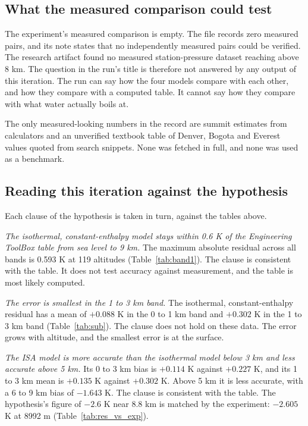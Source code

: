 \documentclass[11pt,letterpaper]{article}
\begin{document}
\subsection{What the measured comparison could test}

The experiment's measured comparison is empty. The file records zero measured pairs, and its note states that no independently measured pairs could be verified. The research artifact found no measured station-pressure dataset reaching above 8 km. The question in the run's title is therefore not answered by any output of this iteration. The run can say how the four models compare with each other, and how they compare with a computed table. It cannot say how they compare with what water actually boils at.

The only measured-looking numbers in the record are summit estimates from calculators and an unverified textbook table of Denver, Bogota and Everest values quoted from search snippets. None was fetched in full, and none was used as a benchmark.

\subsection{Reading this iteration against the hypothesis}

Each clause of the hypothesis is taken in turn, against the tables above.

\emph{The isothermal, constant-enthalpy model stays within 0.6 K of the Engineering ToolBox table from sea level to 9 km.} The maximum absolute residual across all bands is 0.593 K at 119 altitudes (Table~\ref{tab:band1}). The clause is consistent with the table. It does not test accuracy against measurement, and the table is most likely computed.

\emph{The error is smallest in the 1 to 3 km band.} The isothermal, constant-enthalpy residual has a mean of $+0.088$ K in the 0 to 1 km band and $+0.302$ K in the 1 to 3 km band (Table~\ref{tab:sub}). The clause does not hold on these data. The error grows with altitude, and the smallest error is at the surface.

\emph{The ISA model is more accurate than the isothermal model below 3 km and less accurate above 5 km.} Its 0 to 3 km bias is $+0.114$ K against $+0.227$ K, and its 1 to 3 km mean is $+0.135$ K against $+0.302$ K. Above 5 km it is less accurate, with a 6 to 9 km bias of $-1.643$ K. The clause is consistent with the table. The hypothesis's figure of $-2.6$ K near 8.8 km is matched by the experiment: $-2.605$ K at 8992 m (Table~\ref{tab:res_vs_exp}).
\end{document}
